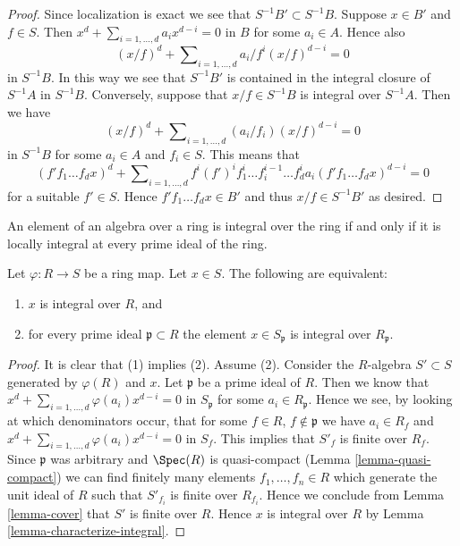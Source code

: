 \begin{proof}
Since localization is exact we see that $S^{-1}B' \subset S^{-1}B$.
Suppose $x \in B'$ and $f \in S$. Then
$x^d + \sum_{i = 1, \ldots, d} a_i x^{d - i} = 0$
in $B$ for some $a_i \in A$. Hence also
$$
(x/f)^d + \sum\nolimits_{i = 1, \ldots, d} a_i/f^i (x/f)^{d - i} = 0
$$
in $S^{-1}B$. In this way we see that $S^{-1}B'$ is contained in
the integral closure of $S^{-1}A$ in $S^{-1}B$. Conversely, suppose
that $x/f \in S^{-1}B$ is integral over $S^{-1}A$. Then we have
$$
(x/f)^d + \sum\nolimits_{i = 1, \ldots, d} (a_i/f_i) (x/f)^{d - i} = 0
$$
in $S^{-1}B$ for some $a_i \in A$ and $f_i \in S$. This means that
$$
(f'f_1 \ldots f_d x)^d +
\sum\nolimits_{i = 1, \ldots, d}
f^i(f')^if_1^i \ldots f_i^{i - 1} \ldots f_d^i a_i
(f'f_1 \ldots f_dx)^{d - i} = 0
$$
for a suitable $f' \in S$. Hence $f'f_1\ldots f_dx \in B'$ and thus
$x/f \in S^{-1}B'$ as desired.
\end{proof}

\begin{lemma}
\label{lemma-integral-closure-stalks}
\begin{slogan}
An element of an algebra over a ring is integral over the ring
if and only if it is locally integral at every prime ideal of the ring.
\end{slogan}
Let $\varphi : R \to S$ be a ring map.
Let $x \in S$. The following are equivalent:
\begin{enumerate}
\item $x$ is integral over $R$, and
\item for every prime ideal $\mathfrak p \subset R$ the element
$x \in S_{\mathfrak p}$ is integral over $R_{\mathfrak p}$.
\end{enumerate}
\end{lemma}

\begin{proof}
It is clear that (1) implies (2). Assume (2). Consider the $R$-algebra
$S' \subset S$ generated by $\varphi(R)$ and $x$. Let $\mathfrak p$ be
a prime ideal of $R$. Then we know that
$x^d + \sum_{i = 1, \ldots, d} \varphi(a_i) x^{d - i} = 0$
in $S_{\mathfrak p}$ for some $a_i \in R_{\mathfrak p}$. Hence we see,
by looking at which denominators occur, that
for some $f \in R$, $f \not \in \mathfrak p$ we have
$a_i \in R_f$ and
$x^d + \sum_{i = 1, \ldots, d} \varphi(a_i) x^{d - i} = 0$
in $S_f$. This implies that $S'_f$ is finite over $R_f$.
Since $\mathfrak p$ was arbitrary and $\Spec(R)$ is quasi-compact
(Lemma \ref{lemma-quasi-compact}) we can find finitely many elements
$f_1, \ldots, f_n \in R$
which generate the unit ideal of $R$ such that $S'_{f_i}$ is finite
over $R_{f_i}$. Hence we conclude from Lemma \ref{lemma-cover} that
$S'$ is finite over $R$. Hence $x$ is integral over $R$ by
Lemma \ref{lemma-characterize-integral}.
\end{proof}

